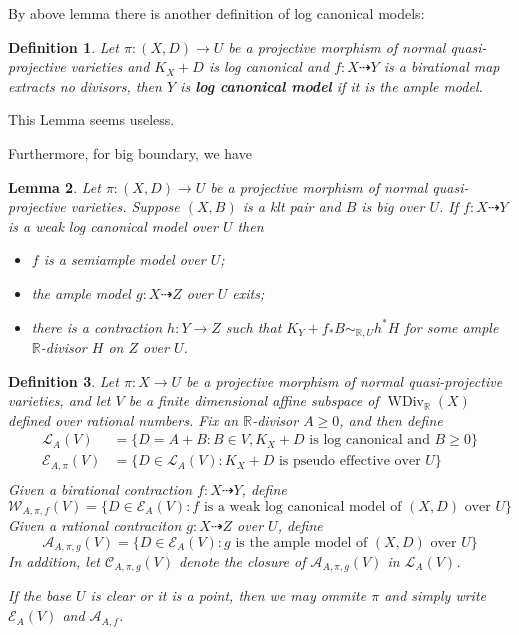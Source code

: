\documentclass{article}
\newtheorem{defn}{Definition}[subsection]
\newtheorem{lem}[defn]{Lemma}
\begin{document}
By above lemma there is another definition of log canonical models:
\begin{defn}
  Let $ \pi:(X,D)\to U $ be a projective morphism of normal quasi-projective varieties and $ K_X+D $ is log canonical and $ f:X\dashrightarrow Y $ is a birational map extracts no divisors, then $ Y $ is \textbf{ log canonical model} if it is the ample model. 
\end{defn}
This Lemma seems useless.

Furthermore, for big boundary, we have
\begin{lem}\cite[Lemma 3.9.3]{birkarExistenceMinimalModels2009}Let $ \pi:(X,D)\to U $ be a projective morphism of normal quasi-projective varieties. Suppose $(X,B)$ is a klt pair and  $B$ is big over $U$. If $f:X\dashrightarrow Y$ is a weak log canonical model over $U$ then
  \begin{itemize}
    \item $f$ is a semiample model over $U$;
    \item  the ample model $g:X \dashrightarrow Z$ over $U$ exits;
    \item  there is a contraction $h:Y\to Z$ such that $K_{Y}+f_*B\sim_{\mathbb{R},U} h^*H$ for some ample $\mathbb{R}$-divisor $H$ on $Z$ over $U$.   
  \end{itemize}
\end{lem}
\begin{defn}\label{polytopeofdivisor}
  \cite[Definition 1.1.4]{birkarExistenceMinimalModels2009} Let $ \pi:X\to U $ be a projective morphism of normal quasi-projective varieties, and  let $ V $ be a finite dimensional affine subspace of $ \operatorname{WDiv}_{\mathbb{R}}(X) $ defined over rational numbers. Fix an $ \mathbb{R} $-divisor $ A\geqslant 0 $, and then define
  \[
    \begin{aligned}
      \mathcal{L}_A(V)&=\{D=A+B:B \in V,  K_X+D \text{ is log canonical and  } B\geqslant0 \}\\
      \mathcal{E}_{A,\pi}(V)&=\{D\in \mathcal{L}_A(V): K_X+D \text{ is pseudo effective over } U\}\\ 
    \end{aligned}
  \]
  Given a birational contraction $ f:X \dashrightarrow Y $, define
  \[ \mathcal{W}_{A,\pi,f}(V)=\{D\in \mathcal{E}_{A}(V): f \text{ is a weak log canonical model of  } (X,D) \text{ over }U\} \]
  Given a rational contraciton $g:X\dashrightarrow Z  $ over $ U $, define
  \[ \mathcal{A}_{A,\pi,g}(V)=\{D\in \mathcal{E}_{A}(V): g \text{ is the ample model of  } (X,D) \text{ over }U\} \]
  In addition, let $ \mathcal{C}_{A,\pi,g}(V) $ denote the closure of $ \mathcal{A}_{A,\pi,g}(V) $ in $\mathcal{L}_{A}(V)$.

  If the base $U$ is clear or it is a point, then we may ommite $\pi$ and simply write $\mathcal{E}_{A}(V)$ and $\mathcal{A}_{A,f}$.
\end{defn}
\end{document}
